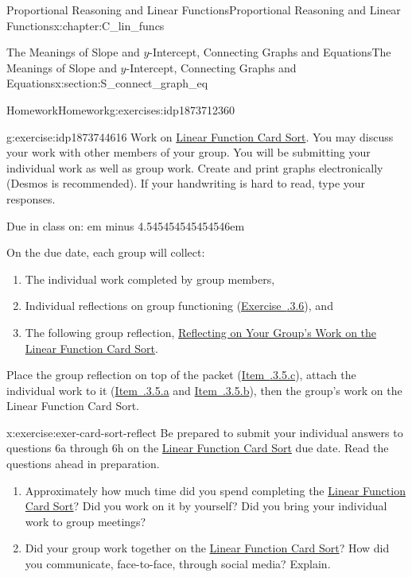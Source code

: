 \documentclass[oneside,10pt,]{book}
\newcommand{\xreffont}{\relax}
\newcommand{\fillin}[1]{\leavevmode\leaders\vrule height -1.2pt depth 1.5pt \hskip #1em minus #1em \null}
\numberwithin{equation}{chapter}
\begin{document}
\begin{chapterptx}{Proportional Reasoning and Linear Functions}{}{Proportional Reasoning and Linear Functions}{}{}{x:chapter:C_lin_funcs}
\begin{sectionptx}{The Meanings of Slope and \(y\)-Intercept, Connecting Graphs and Equations}{}{The Meanings of Slope and \(y\)-Intercept, Connecting Graphs and Equations}{}{}{x:section:S_connect_graph_eq}
\begin{exercises-subsection}{Homework}{}{Homework}{}{}{g:exercises:idp1873712360}
\begin{divisionexercise}{5}{}{}{g:exercise:idp1873744616}%
Work on \hyperref[x:worksheet:act-lin-card-sort]{Linear Function Card Sort}. You may discuss your work with other members of your group. You will be submitting your individual work as well as group work. Create and print graphs electronically (Desmos is recommended). If your handwriting is hard to read, type your responses.%
\par
Due in class on: \fillin{4.545454545454546}%
\par
On the due date, each group will collect:%
\begin{enumerate}[label=(\alph*)]
\item\hypertarget{x:li:card-sort-instr-1}{}The individual work completed by group members,%
\item\hypertarget{x:li:card-sort-instr-2}{}Individual reflections on group functioning (\hyperlink{x:exercise:exer-card-sort-reflect}{Exercise~{\xreffont 2.7.3.6}}), and%
\item\hypertarget{x:li:card-sort-instr-3}{}The following group reflection, \hyperref[x:worksheet:act-card-sort-reflect]{Reflecting on Your Group's Work on the Linear Function Card Sort}.%
\end{enumerate}
%
\par
Place the group reflection on top of the packet (\hyperlink{x:li:card-sort-instr-3}{Item~{\xreffont 2.7.3.5.c}}), attach the individual work to it (\hyperlink{x:li:card-sort-instr-1}{Item~{\xreffont 2.7.3.5.a}} and \hyperlink{x:li:card-sort-instr-2}{Item~{\xreffont 2.7.3.5.b}}), then the group's work on the Linear Function Card Sort.%
\end{divisionexercise}%
\begin{divisionexercise}{6}{}{}{x:exercise:exer-card-sort-reflect}%
Be prepared to submit your individual answers to questions 6a through 6h on the \hyperref[x:worksheet:act-lin-card-sort]{Linear Function Card Sort} due date. Read the questions ahead in preparation.%
\begin{enumerate}[font=\bfseries,label=(\alph*),ref=\alph*]
\item{}Approximately how much time did you spend completing the \hyperref[x:worksheet:act-lin-card-sort]{Linear Function Card Sort}? Did you work on it by yourself? Did you bring your individual work to group meetings?%
\item{}Did your group work together on the \hyperref[x:worksheet:act-lin-card-sort]{Linear Function Card Sort}? How did you communicate, face-to-face, through social media? Explain.%

\end{enumerate}
\end{divisionexercise}
\end{exercises-subsection}
\end{sectionptx}
\end{chapterptx}
\end{document}
